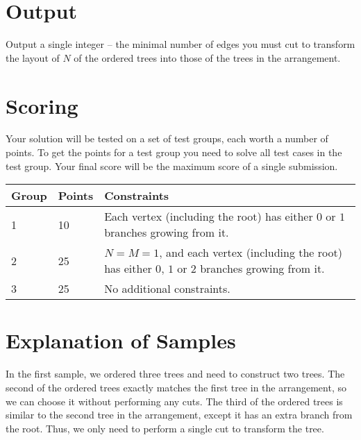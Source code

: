 \section*{Output}
Output a single integer -- the minimal number of edges you must cut to transform the layout of $N$ of the ordered trees into those of the trees in the arrangement.

\section*{Scoring}
Your solution will be tested on a set of test groups, each worth a number of points.
To get the points for a test group you need to solve all test cases in the test group.
Your final score will be the maximum score of a single submission.

\noindent
\begin{tabular}{| l | l | p{10cm} |}
\hline
Group & Points & Constraints \\ \hline
1     & 10     & Each vertex (including the root) has either $0$ or $1$ branches growing from it.  \\ \hline
2     & 25     & $N = M = 1$, and each vertex (including the root) has either $0$, $1$ or $2$ branches growing from it.  \\ \hline
3     & 25     & No additional constraints. \\ \hline
\end{tabular}

\section*{Explanation of Samples}
In the first sample, we ordered three trees and need to construct two trees.
The second of the ordered trees exactly matches the first tree in the arrangement, so we can choose it without performing any cuts.
The third of the ordered trees is similar to the second tree in the arrangement, except it has an extra branch from the root.
Thus, we only need to perform a single cut to transform the tree.

